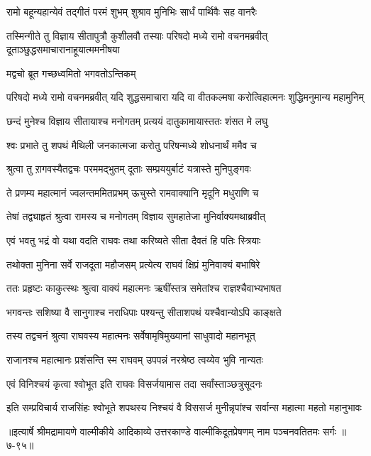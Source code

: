 
\twolineshloka
{रामो बहून्यहान्येवं तद्गीतं परमं शुभम्}
{शुश्राव मुनिभिः सार्धं पार्थिवैः सह वानरैः} %

\threelineshloka
{तस्मिन्गीते तु विज्ञाय सीतापुत्रौ कुशीलवौ}
{तस्याः परिषदो मध्ये रामो वचनमब्रवीत्}
{दूताञ्छुद्धसमाचारानाहूयात्ममनीषया} %

\onelineshloka
{मद्वचो ब्रूत गच्छध्वमितो भगवतोऽन्तिकम्} %

\threelineshloka
{परिषदो मध्ये रामो वचनमब्रवीत्}
{यदि शुद्धसमाचारा यदि वा वीतकल्मषा}
{करोत्विहात्मनः शुद्धिमनुमान्य महामुनिम्} %

\twolineshloka
{छन्दं मुनेश्च विज्ञाय सीतायाश्च मनोगतम्}
{प्रत्ययं दातुकामायास्ततः शंसत मे लघु} %

\twolineshloka
{श्वः प्रभाते तु शपथं मैथिली जनकात्मजा}
{करोतु परिषन्मध्ये शोधनार्थं ममैव च} %

\twolineshloka
{श्रुत्वा तु ऱागवस्यैतद्वचः परममद्भुतम्}
{दूताः सम्प्रययुर्बाटं यत्रास्ते मुनिपुङ्गवः} %

\twolineshloka
{ते प्रणम्य महात्मानं ज्वलन्तममितप्रभम्}
{ऊचुस्ते रामवाक्यानि मृदूनि मधुराणि च} %

\twolineshloka
{तेषां तद्व्याहृतं श्रुत्वा रामस्य च मनोगतम्}
{विज्ञाय सुमहातेजा मुनिर्वाक्यमथाब्रवीत्} %

\twolineshloka
{एवं भवतु भद्रं वो यथा वदति राघवः}
{तथा करिष्यते सीता दैवतं हि पतिः स्त्रियाः} %

\twolineshloka
{तथोक्ता मुनिना सर्वे राजदूता महौजसम्}
{प्रत्येत्य राघवं क्षिप्रं मुनिवाक्यं बभाषिरे} %

\twolineshloka
{ततः प्रहृष्टः काकुत्स्थः श्रुत्वा वाक्यं महात्मनः}
{ऋषींस्तत्र समेतांश्च राज्ञश्चैवाभ्यभाषत} %

\twolineshloka
{भगवन्तः सशिष्या वै सानुगाश्च नराधिपाः}
{पश्यन्तु सीताशपथं यश्चैवान्योऽपि काङ्क्षते} %

\twolineshloka
{तस्य तद्वचनं श्रुत्वा राघवस्य महात्मनः}
{सर्वेषामृषिमुख्यानां साधुवादो महानभूत्} %

\twolineshloka
{राजानश्च महात्मानः प्रशंसन्ति स्म राघवम्}
{उपपन्नं नरश्रेष्ठ त्वय्येव भुवि नान्यतः} %

\twolineshloka
{एवं विनिश्चयं कृत्वा श्वोभूत इति राघवः}
{विसर्जयामास तदा सर्वांस्ताञ्छत्रुसूदनः} %

\twolineshloka
{इति सम्प्रविचार्य राजसिंहः श्वोभूते शपथस्य निश्चयं वै}
{विससर्ज मुनीन्नृपांश्च सर्वान्स महात्मा महतो महानुभावः} %


॥इत्यार्षे श्रीमद्रामायणे वाल्मीकीये आदिकाव्ये उत्तरकाण्डे वाल्मीकिदूतप्रेषणम् नाम पञ्चनवतितमः सर्गः ॥७-९५॥
